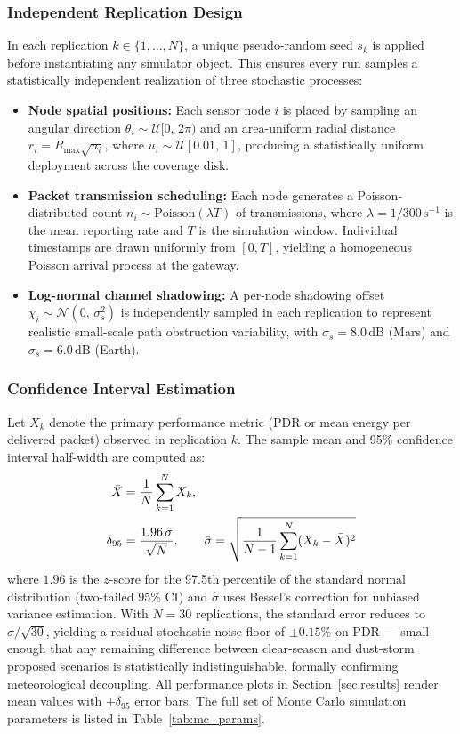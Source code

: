 \documentclass{ijuc}
\begin{document}
\subsubsection{Independent Replication Design}
In each replication $k \in \{1, \ldots, N\}$, a unique pseudo-random seed $s_k$ is applied before instantiating any simulator object. This ensures every run samples a statistically independent realization of three stochastic processes:
\begin{itemize}
    \item \textbf{Node spatial positions:} Each sensor node $i$ is placed by sampling an angular direction $\theta_i \sim \mathcal{U}[0,\,2\pi)$ and an area-uniform radial distance $r_i = R_{\max}\sqrt{u_i}$, where $u_i \sim \mathcal{U}[0.01,\,1]$, producing a statistically uniform deployment across the coverage disk.
    \item \textbf{Packet transmission scheduling:} Each node generates a Poisson-distributed count $n_i \sim \text{Poisson}(\lambda T)$ of transmissions, where $\lambda = 1/300\,\text{s}^{-1}$ is the mean reporting rate and $T$ is the simulation window. Individual timestamps are drawn uniformly from $[0, T]$, yielding a homogeneous Poisson arrival process at the gateway.
    \item \textbf{Log-normal channel shadowing:} A per-node shadowing offset $\chi_i \sim \mathcal{N}(0,\,\sigma_s^2)$ is independently sampled in each replication to represent realistic small-scale path obstruction variability, with $\sigma_s = 8.0\,\text{dB}$ (Mars) and $\sigma_s = 6.0\,\text{dB}$ (Earth).
\end{itemize}

\subsubsection{Confidence Interval Estimation}
Let $X_k$ denote the primary performance metric (PDR or mean energy per delivered packet) observed in replication $k$. The sample mean and 95\% confidence interval half-width are computed as:
\begin{align}
    \bar{X} &= \frac{1}{N}\sum_{k=1}^{N} X_k, \notag \\
    \delta_{95} &= \frac{1.96\,\hat{\sigma}}{\sqrt{N}}, \qquad
    \hat{\sigma} = \sqrt{\frac{1}{N-1}\sum_{k=1}^{N}(X_k - \bar{X})^2}
\label{eq:ci}
\end{align}
where $1.96$ is the $z$-score for the 97.5th percentile of the standard normal distribution (two-tailed 95\% CI) and $\hat{\sigma}$ uses Bessel's correction for unbiased variance estimation. With $N=30$ replications, the standard error reduces to $\hat{\sigma}/\sqrt{30}$, yielding a residual stochastic noise floor of $\pm 0.15\%$ on PDR --- small enough that any remaining difference between clear-season and dust-storm proposed scenarios is statistically indistinguishable, formally confirming meteorological decoupling. All performance plots in Section~\ref{sec:results} render mean values with $\pm\delta_{95}$ error bars. The full set of Monte Carlo simulation parameters is listed in Table~\ref{tab:mc_params}.
\end{document}
